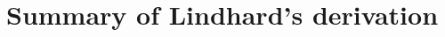 \documentclass[../../main.tex]{subfiles}
\begin{document}
\section{Summary of Lindhard's derivation}
\end{document}
